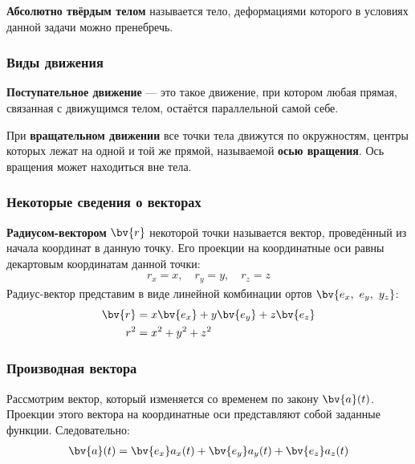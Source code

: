 \begin{definition}
    \textbf{Абсолютно твёрдым телом} называется тело, деформациями которого в условиях данной задачи можно пренебречь.
\end{definition}

\subsubsection{Виды движения}

\begin{definition}
    \textbf{Поступательное движение} --- это такое движение, при котором любая прямая, связанная с движущимся телом, остаётся параллельной самой себе.
\end{definition}

\begin{definition}
    При \textbf{вращательном движении} все точки тела движутся по окружностям, центры которых лежат на одной и той же прямой, называемой \textbf{осью вращения}. Ось вращения может находиться вне тела.
\end{definition}


\subsubsection{Некоторые сведения о векторах}

\begin{definition}
    \textbf{Радиусом-вектором} $\bv{r}$ некоторой точки называется вектор, проведённый из начала координат в данную точку. Его проекции на координатные оси равны декартовым координатам данной точки:
    \begin{gather*}
        r_x = x,\quad r_y = y,\quad r_z = z
    \end{gather*}
    Радиус-вектор представим в виде линейной комбинации ортов $\bv{e_x,\ e_y,\ y_z}$:
    \begin{align*}
        \bv{r} &= x\bv{e_x} + y\bv{e_y} + z\bv{e_z} \\
        r^2 &= x^2 + y^2 + z^2
    \end{align*}
\end{definition}

\newpage
\subsubsection{Производная вектора}

\hspace{\parindent}Рассмотрим вектор, который изменяется со временем по закону $\bv{a} (t)$. Проекции этого вектора на координатные оси представляют собой заданные функции. Следовательно:
\begin{align}
    \bv{a} (t) = \bv{e_x} a_x (t) + \bv{e_y} a_y (t) + \bv{e_z} a_z (t)
\end{align}


